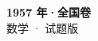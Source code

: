 \documentclass[zihao=-4, a4paper]{ctexart}
\begin{document}
\begin{center}
  {\Large\bfseries 1957 年·全国卷}\\[4pt]
  {\large 数学 · 试题版}
\end{center}
\medskip
{}

\end{document}
